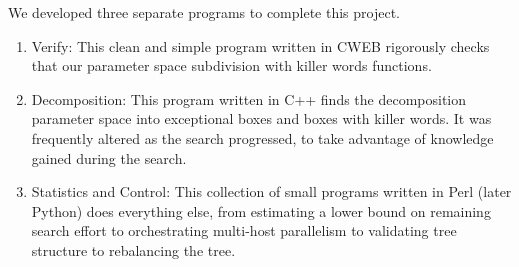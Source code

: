 We developed three separate programs to complete this
project.
\begin{enumerate}
	\item Verify:
		This clean and simple program written in CWEB
		rigorously checks that
		our parameter space subdivision with killer words functions.
	\item Decomposition:
		This program written in C++ finds the decomposition
		parameter space into exceptional boxes and boxes with killer words.
		It was frequently altered as the search progressed,
		to take advantage of knowledge gained during the search.
	\item Statistics and Control:
		This collection of small programs written in Perl (later Python)
		does everything else,
		from estimating a lower bound on remaining search effort
		to orchestrating multi-host parallelism
		to validating tree structure to rebalancing the tree.
\end{enumerate}
